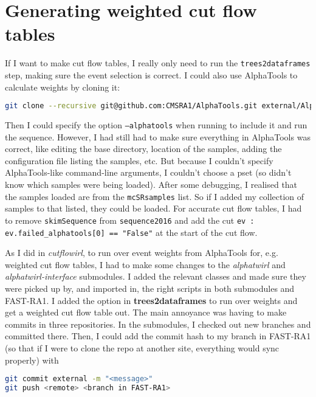 \section{Generating weighted cut flow tables}

If I want to make cut flow tables, I really only need to run the \texttt{trees2dataframes} step, making sure the event selection is correct. I could also use AlphaTools to calculate weights by cloning it:

\begin{lstlisting}[belowskip=-0.7cm, language=sh, numbers=none]
git clone --recursive git@github.com:CMSRA1/AlphaTools.git external/AlphaTools
\end{lstlisting}

Then I could specify the option \texttt{--alphatools} when running to include it and run the sequence. However, I had still had to make sure everything in AlphaTools was correct, like editing the base directory, location of the samples, adding the configuration file listing the samples, etc. But because I couldn't specify AlphaTools-like command-line arguments, I couldn't choose a pset (so didn't know which samples were being loaded). After some debugging, I realised that the samples loaded are from the \texttt{mcSRsamples} list. So if I added my collection of samples to that listed, they could be loaded. For accurate cut flow tables, I had to remove \texttt{skimSequence} from \texttt{sequence2016} and add the cut \texttt{ev : ev.failed\_alphatools[0] == "False"} at the start of the cut flow.

As I did in \emph{cutflowirl}, to run over event weights from AlphaTools for, e.g. weighted cut flow tables, I had to make some changes to the \emph{alphatwirl} and \emph{alphatwirl-interface} submodules. I added the relevant classes and made sure they were picked up by, and imported in, the right scripts in both submodules and FAST-RA1. I added the option in \textbf{trees2dataframes} to run over weights and get a weighted cut flow table out. The main annoyance was having to make commits in three repositories. In the submodules, I checked out new branches and committed there. Then, I could add the commit hash to my branch in FAST-RA1 (so that if I were to clone the repo at another site, everything would sync properly) with

\begin{lstlisting}[belowskip=-0.7cm, language=sh, numbers=none]
git commit external -m "<message>"
git push <remote> <branch in FAST-RA1>
\end{lstlisting}

